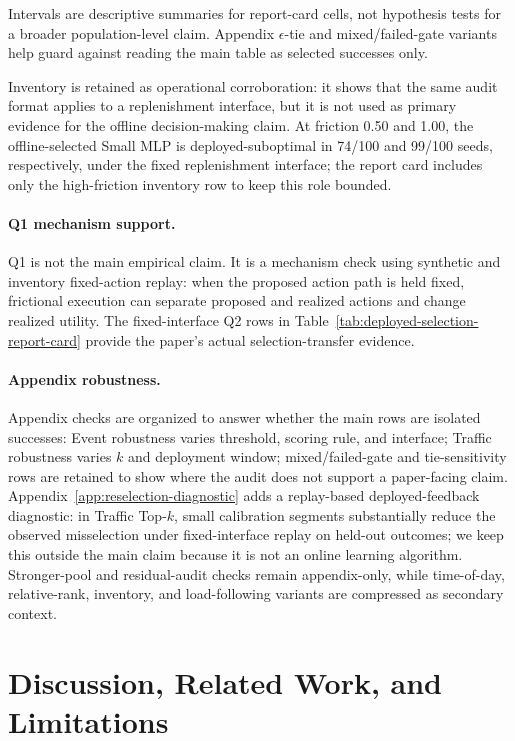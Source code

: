 \documentclass{article}
\begin{document}
Intervals are descriptive summaries for report-card cells, not hypothesis tests for a broader population-level claim. Appendix \(\epsilon\)-tie and mixed/failed-gate variants help guard against reading the main table as selected successes only.

Inventory is retained as operational corroboration: it shows that the same audit format applies to a replenishment interface, but it is not used as primary evidence for the offline decision-making claim. At friction 0.50 and 1.00, the offline-selected Small MLP is deployed-suboptimal in 74/100 and 99/100 seeds, respectively, under the fixed replenishment interface; the report card includes only the high-friction inventory row to keep this role bounded.

\paragraph{Q1 mechanism support.} Q1 is not the main empirical claim. It is a mechanism check using synthetic and inventory fixed-action replay: when the proposed action path is held fixed, frictional execution can separate proposed and realized actions and change realized utility. The fixed-interface Q2 rows in Table~\ref{tab:deployed-selection-report-card} provide the paper's actual selection-transfer evidence.

\paragraph{Appendix robustness.} Appendix checks are organized to answer whether the main rows are isolated successes: Event robustness varies threshold, scoring rule, and interface; Traffic robustness varies \(k\) and deployment window; mixed/failed-gate and tie-sensitivity rows are retained to show where the audit does not support a paper-facing claim. Appendix~\ref{app:reselection-diagnostic} adds a replay-based deployed-feedback diagnostic: in Traffic Top-\(k\), small calibration segments substantially reduce the observed misselection under fixed-interface replay on held-out outcomes; we keep this outside the main claim because it is not an online learning algorithm. Stronger-pool and residual-audit checks remain appendix-only, while time-of-day, relative-rank, inventory, and load-following variants are compressed as secondary context.

\section{Discussion, Related Work, and Limitations}
\end{document}
